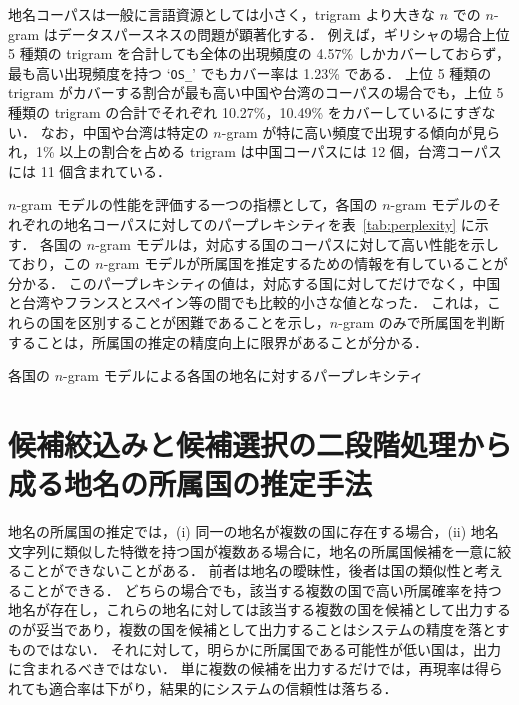 \documentclass[japanese]{jnlp_1.4}
\begin{document}
地名コーパスは一般に言語資源としては小さく，trigram より大きな $n$ での $n$-gram はデータスパースネスの問題が顕著化する．
例えば，ギリシャの場合上位 5 種類の trigram を合計しても全体の出現頻度の 4.57\% しかカバーしておらず，最も高い出現頻度を持つ `\texttt{OS\_}' でもカバー率は 1.23\% である．
上位 5 種類の trigram がカバーする割合が最も高い中国や台湾のコーパスの場合でも，上位 5 種類の trigram の合計でそれぞれ 10.27\%，10.49\% をカバーしているにすぎない．
なお，中国や台湾は特定の $n$-gram が特に高い頻度で出現する傾向が見られ，1\% 以上の割合を占める trigram は中国コーパスには 12 個，台湾コーパスには 11 個含まれている．

$n$-gram モデルの性能を評価する一つの指標として，各国の $n$-gram モデルのそれぞれの地名コーパスに対してのパープレキシティを表~\ref{tab:perplexity} に示す．
各国の $n$-gram モデルは，対応する国のコーパスに対して高い性能を示しており，この $n$-gram モデルが所属国を推定するための情報を有していることが分かる．
このパープレキシティの値は，対応する国に対してだけでなく，中国と台湾やフランスとスペイン等の間でも比較的小さな値となった．
これは，これらの国を区別することが困難であることを示し，$n$-gram のみで所属国を判断することは，所属国の推定の精度向上に限界があることが分かる．

\begin{table}[t]
  \caption{各国の $n$-gram モデルによる各国の地名に対するパープレキシティ}
  \label{tab:perplexity}

\end{table}


\section{候補絞込みと候補選択の二段階処理から成る地名の所属国の推定手法}
\label{sec:two-phase-area-identification-method}

地名の所属国の推定では，(i) 同一の地名が複数の国に存在する場合，(ii) 地名文字列に類似した特徴を持つ国が複数ある場合に，地名の所属国候補を一意に絞ることができないことがある．
前者は地名の曖昧性，後者は国の類似性と考えることができる．
どちらの場合でも，該当する複数の国で高い所属確率を持つ地名が存在し，これらの地名に対しては該当する複数の国を候補として出力するのが妥当であり，複数の国を候補として出力することはシステムの精度を落とすものではない．
それに対して，明らかに所属国である可能性が低い国は，出力に含まれるべきではない．
単に複数の候補を出力するだけでは，再現率は得られても適合率は下がり，結果的にシステムの信頼性は落ちる．
\end{document}
